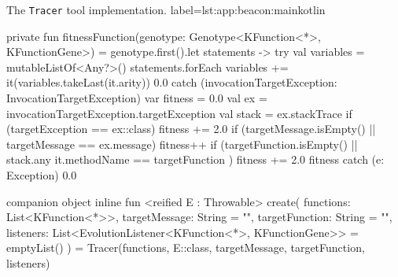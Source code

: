 \begin{code}{%
    The \texttt{Tracer} tool implementation.
}{label=lst:app:beacon:main}{kotlin}
{        private fun fitnessFunction(genotype: Genotype<KFunction<*>, KFunctionGene>) = genotype.first().let { statements ->
            try {
                val variables = mutableListOf<Any?>()
                statements.forEach {
                    variables += it(variables.takeLast(it.arity))
                }
                0.0
            } catch (invocationTargetException: InvocationTargetException) {
                var fitness = 0.0
                val ex = invocationTargetException.targetException
                val stack = ex.stackTrace
                if (targetException == ex::class) {
                    fitness += 2.0
                    if (targetMessage.isEmpty() || targetMessage == ex.message) {
                        fitness++
                    }
                }
                if (targetFunction.isEmpty() || stack.any { it.methodName == targetFunction }) {
                    fitness += 2.0
                }
                fitness
            } catch (e: Exception) {
                0.0
            }
        }

        companion object {
            inline fun <reified E : Throwable> create(
                functions: List<KFunction<*>>,
                targetMessage: String = "",
                targetFunction: String = "",
                listeners: List<EvolutionListener<KFunction<*>, KFunctionGene>> = emptyList()
            ) = Tracer(functions, E::class, targetMessage, targetFunction, listeners)
        }
    }
\end{code}
